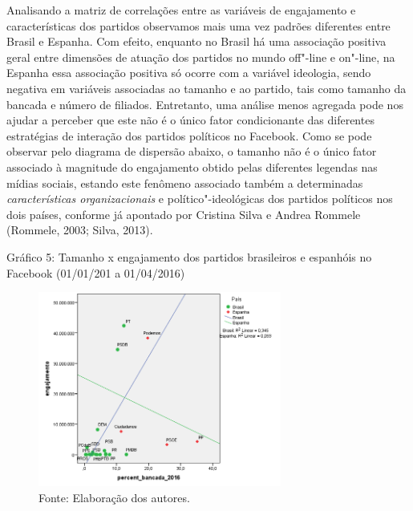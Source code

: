 
Analisando a matriz de correlações entre as variáveis de engajamento e
características dos partidos observamos mais uma vez padrões diferentes
entre Brasil e Espanha. Com efeito, enquanto no Brasil há uma associação
positiva geral entre dimensões de atuação dos partidos no mundo off"-line
e on"-line, na Espanha essa associação positiva só ocorre com a variável
ideologia, sendo negativa em variáveis associadas ao tamanho e ao
partido, tais como tamanho da bancada e número de filiados. Entretanto,
uma análise menos agregada pode nos ajudar a perceber que este não é o
único fator condicionante das diferentes estratégias de interação dos
partidos políticos no Facebook. Como se pode observar pelo diagrama de
dispersão abaixo, o tamanho não é o único fator associado à magnitude do
engajamento obtido pelas diferentes legendas nas mídias sociais, estando
este fenômeno associado também a determinadas \emph{características
organizacionais} e político"-ideológicas dos partidos políticos nos dois
países, conforme já apontado por Cristina Silva e Andrea Rommele
(Rommele, 2003; Silva, 2013).

\pagebreak

\begin{center}
Gráfico 5: Tamanho x engajamento dos partidos brasileiros e espanhóis no
Facebook (01/01/201 a 01/04/2016) %
\end{center}

\begin{figure}[!ht]
\centering
 \includegraphics[width=80mm]{./imgs/graf5.png}
\caption{Fonte: Elaboração dos autores.}
\end{figure}


